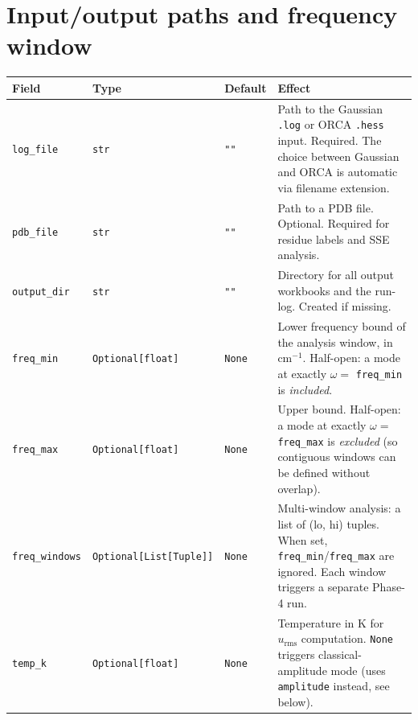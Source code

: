 \documentclass[10pt,a4paper,twoside]{article}
\newcommand{\urms}{u_{\mathrm{rms}}}
\newcommand{\file}[1]{\texttt{#1}}
\newcommand{\cfgkey}[1]{\texttt{#1}}
\begin{document}
\section{Input/output paths and frequency window}

\begin{longtable}{p{} p{} p{} p{}}
\toprule
\textbf{Field} & \textbf{Type} & \textbf{Default} & \textbf{Effect} \\
\midrule
\cfgkey{log\_file} & \texttt{str} & \texttt{""}
  & Path to the Gaussian \file{.log} or ORCA \file{.hess} input.
    Required. The choice between Gaussian and ORCA is automatic
    via filename extension. \\
\cfgkey{pdb\_file} & \texttt{str} & \texttt{""}
  & Path to a PDB file. Optional. Required for residue labels and
    SSE analysis. \\
\cfgkey{output\_dir} & \texttt{str} & \texttt{""}
  & Directory for all output workbooks and the run-log. Created
    if missing. \\
\cfgkey{freq\_min} & \texttt{Optional[float]} & \texttt{None}
  & Lower frequency bound of the analysis window, in cm$^{-1}$.
    Half-open: a mode at exactly $\omega = $ \cfgkey{freq\_min} is
    \emph{included}. \\
\cfgkey{freq\_max} & \texttt{Optional[float]} & \texttt{None}
  & Upper bound. Half-open: a mode at exactly $\omega = $
    \cfgkey{freq\_max} is \emph{excluded} (so contiguous windows
    can be defined without overlap). \\
\cfgkey{freq\_windows} & \texttt{Optional[List[Tuple]]} & \texttt{None}
  & Multi-window analysis: a list of (lo, hi) tuples. When set,
    \cfgkey{freq\_min}/\cfgkey{freq\_max} are ignored. Each window
    triggers a separate Phase-4 run. \\
\cfgkey{temp\_k} & \texttt{Optional[float]} & \texttt{None}
  & Temperature in K for $\urms$ computation. \texttt{None}
    triggers classical-amplitude mode (uses \cfgkey{amplitude}
    instead, see below). \\
\bottomrule
\end{longtable}
\end{document}
